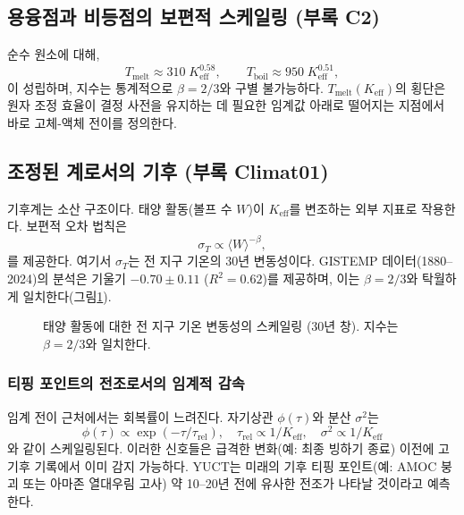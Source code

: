 \documentclass[12pt,a4paper]{article}
\newcommand{\Keff}{K_{\mathrm{eff}}}
\begin{document}
	\subsection{용융점과 비등점의 보편적 스케일링 (부록 C2)}
	
	순수 원소에 대해,
	\[
	T_{\text{melt}} \approx 310\;\Keff^{0.58}, \qquad
	T_{\text{boil}} \approx 950\;\Keff^{0.51},
	\]
	이 성립하며, 지수는 통계적으로 \(\beta = 2/3\)와 구별 불가능하다. \(T_{\text{melt}}(\Keff)\)의 횡단은 원자 조정 효율이 결정 사전을 유지하는 데 필요한 임계값 아래로 떨어지는 지점에서 바로 고체-액체 전이를 정의한다.
	
	\subsection{조정된 계로서의 기후 (부록 Climat01)}
	
	기후계는 소산 구조이다. 태양 활동(볼프 수 \(W\))이 \(\Keff\)를 변조하는 외부 지표로 작용한다. 보편적 오차 법칙은
	\[
	\sigma_T \propto \langle W \rangle^{-\beta},
	\]
	를 제공한다. 여기서 \(\sigma_T\)는 전 지구 기온의 30년 변동성이다. GISTEMP 데이터(1880–2024)의 분석은 기울기 \(-0.70\pm0.11\) (\(R^2=0.62\))를 제공하며, 이는 \(\beta = 2/3\)와 탁월하게 일치한다(그림\ref{fig:climate_scaling}).
	
	\begin{figure}[H]
		\centering
		\caption{태양 활동에 대한 전 지구 기온 변동성의 스케일링 (30년 창).
			지수는 \(\beta = 2/3\)와 일치한다.}
		\label{fig:climate_scaling}
	\end{figure}
	
	\subsubsection{티핑 포인트의 전조로서의 임계적 감속}
	
	임계 전이 근처에서는 회복률이 느려진다. 자기상관 \(\phi(\tau)\)와 분산 \(\sigma^2\)는
	\[
	\phi(\tau) \propto \exp(-\tau/\tau_{\text{rel}}),\quad
	\tau_{\text{rel}} \propto 1/\Keff,\quad
	\sigma^2 \propto 1/\Keff
	\]
	와 같이 스케일링된다. 이러한 신호들은 급격한 변화(예: 최종 빙하기 종료) 이전에 고기후 기록에서 이미 감지 가능하다. YUCT는 미래의 기후 티핑 포인트(예: AMOC 붕괴 또는 아마존 열대우림 고사) 약 10–20년 전에 유사한 전조가 나타날 것이라고 예측한다.
	
\end{document}
